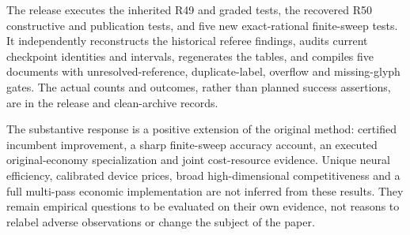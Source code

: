 \documentclass[ecta,nameyear,draft]{econsocart}
\begin{document}
The release executes the inherited R49 and graded tests, the recovered
R50 constructive and publication tests, and five new exact-rational
finite-sweep tests. It independently reconstructs the historical referee
findings, audits current checkpoint identities and intervals,
regenerates the tables, and compiles five documents with
unresolved-reference, duplicate-label, overflow and missing-glyph gates.
The actual counts and outcomes, rather than planned success assertions,
are in the release and clean-archive records.

The substantive response is a positive extension of the original method:
certified incumbent improvement, a sharp finite-sweep accuracy account,
an executed original-economy specialization and joint cost-resource
evidence. Unique neural efficiency, calibrated device prices, broad
high-dimensional competitiveness and a full multi-pass economic
implementation are not inferred from these results. They remain
empirical questions to be evaluated on their own evidence, not reasons
to relabel adverse observations or change the subject of the paper.
\end{document}
